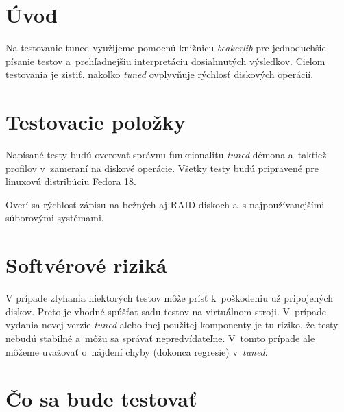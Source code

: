 \section{Úvod}

Na testovanie tuned využijeme pomocnú knižnicu \emph{beakerlib}
\cite{beakerlibHomepage} pre jednoduchšie písanie testov a~prehľadnejšiu
interpretáciu dosiahnutých výsledkov. Cieľom testovania je zistiť, nakoľko
\emph{tuned} ovplyvňuje rýchlosť diskových operácií.

\section{Testovacie položky}

Napísané testy budú overovať správnu funkcionalitu \emph{tuned} démona a~taktiež
profilov v~zameraní na diskové operácie. Všetky testy budú
pripravené pre linuxovú distribúciu Fedora 18\cite{fedoraHomepage}.

Overí sa rýchlosť zápisu na bežných aj RAID diskoch a~s najpoužívanejšími
súborovými systémami.

\section{Softvérové riziká}
\label{sec:softverove-rizika}

V prípade zlyhania niektorých testov môže prísť k~poškodeniu už pripojených
diskov. Preto je vhodné spúšťat sadu testov na virtuálnom stroji. V~prípade
vydania novej verzie \emph{tuned} alebo inej použitej komponenty je tu riziko,
že testy nebudú stabilné a~môžu sa správať nepredvídateľne. V~tomto prípade ale
môžeme uvažovať o~nájdení chyby (dokonca regresie) v~\emph{tuned}.

\section{Čo sa bude testovať}

